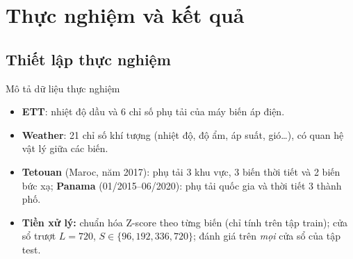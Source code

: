 \documentclass [xcolor=svgnames, notes] {beamer}
\begin{document}
\section{Thực nghiệm và kết quả}
\subsection{Thiết lập thực nghiệm}

\begin{frame}{Mô tả dữ liệu thực nghiệm}
\begin{center}
\end{center}

\footnotesize
\begin{itemize}
    \item \textbf{ETT}: nhiệt độ dầu và 6 chỉ số phụ tải của máy biến áp điện.
    \item \textbf{Weather}: 21 chỉ số khí tượng (nhiệt độ, độ ẩm, áp suất, gió\dots), có quan hệ vật lý giữa các biến.
    \item \textbf{Tetouan} (Maroc, năm 2017): phụ tải 3 khu vực, 3 biến thời tiết và 2 biến bức xạ;
          \textbf{Panama} (01/2015--06/2020): phụ tải quốc gia và thời tiết 3 thành phố.
    \item \textbf{Tiền xử lý:} chuẩn hóa Z-score theo từng biến (chỉ tính trên tập train); cửa sổ trượt $L=720$,
          $S\in\{96,192,336,720\}$; đánh giá trên \emph{mọi} cửa sổ của tập test.
\end{itemize}
\end{frame}
\end{document}
